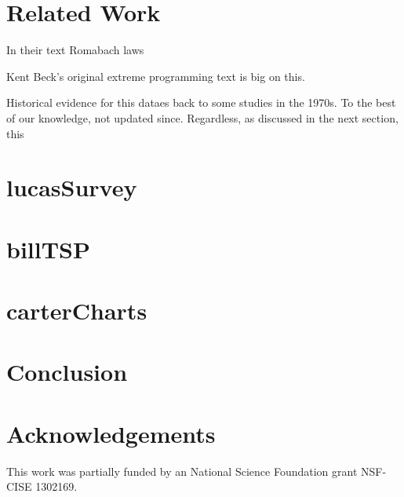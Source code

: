 \documentclass{sig-alternate}
\begin{document}
\section{Related Work}

In their text Romabach laws

Kent Beck's original extreme programming text is big on this.

Historical  evidence for this dataes back to some studies in the 1970s. To the best of
our knowledge, not updated since. Regardless, as discussed in the next section, this


\section{lucasSurvey}



\section{billTSP}

\section{carterCharts}



\section{Conclusion}

\section*{Acknowledgements}
This work was partially funded by an National Science
Foundation grant NSF-CISE 1302169.

\vspace*{0.5mm}
\scriptsize


 
\end{document}
